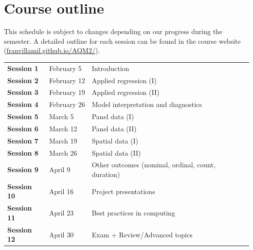 \documentclass[12pt, a4paper]{article}
\begin{document}
\section{Course outline}


This schedule is subject to changes depending on our progress during the semester.
A detailed outline for each session can be found in the course website\\(\href{https://franvillamil.github.io/AQM2/}{franvillamil.github.io/AQM2/}).

\begin{table}[!ht]
  \centering

  \begin{tabular}{lll}
    \textbf{Session 1} & February 5 & Introduction \\
    \textbf{Session 2} & February 12 & Applied regression (I) \\
    \textbf{Session 3} & February 19 & Applied regression (II) \\
    \textbf{Session 4} & February 26 & Model interpretation and diagnostics \\
    \textbf{Session 5} & March 5 & Panel data (I) \\
    \textbf{Session 6} & March 12 & Panel data (II) \\
    \textbf{Session 7} & March 19 & Spatial data (I) \\
    \textbf{Session 8} & March 26 & Spatial data (II) \\
    \textbf{Session 9} &  April 9 & Other outcomes (nominal, ordinal, count, duration) \\
    \textbf{Session 10} & April 16 & Project presentations \\
    \textbf{Session 11} & April 23 & Best practices in computing \\
    \textbf{Session 12} & April 30 & Exam + Review/Advanced topics \\
  \end{tabular}
\end{table}

\end{document}
